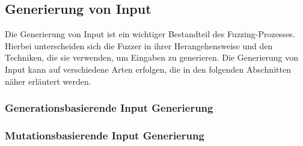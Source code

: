 \subsection{Generierung von Input}\label{subsec:generierung-von-input}
Die Generierung von Input ist ein wichtiger Bestandteil des Fuzzing-Prozesses.
Hierbei unterscheiden sich die Fuzzer in ihrer Herangehensweise und den Techniken, die sie verwenden, um Eingaben zu generieren.
Die Generierung von Input kann auf verschiedene Arten erfolgen, die in den folgenden Abschnitten näher erläutert werden.
\subsubsection{Generationsbasierende Input Generierung}

\subsubsection{Mutationsbasierende Input Generierung}